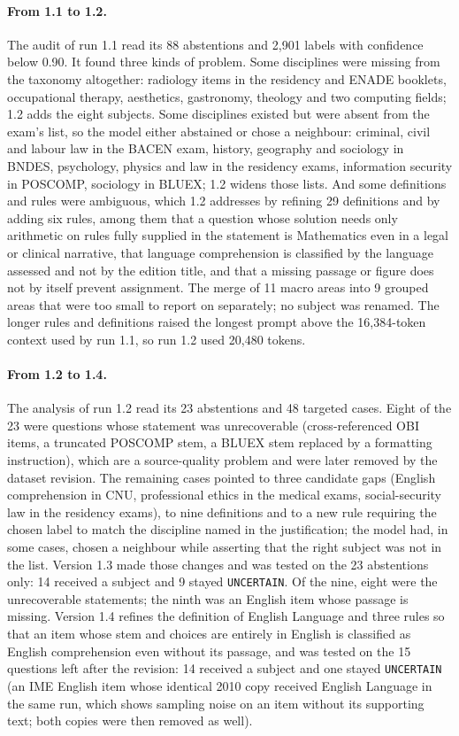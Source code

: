 \paragraph{From 1.1 to 1.2.} The audit of run 1.1 read its 88 abstentions
and 2,901 labels with confidence below 0.90. It found three kinds of problem.
Some disciplines were missing from the taxonomy altogether: radiology items in
the residency and ENADE booklets, occupational therapy, aesthetics,
gastronomy, theology and two computing fields; 1.2 adds the eight subjects.
Some disciplines existed but were absent from the exam's list, so the model
either abstained or chose a neighbour: criminal, civil and labour law in the
BACEN exam, history, geography and sociology in BNDES, psychology, physics and
law in the residency exams, information security in POSCOMP, sociology in
BLUEX; 1.2 widens those lists. And some definitions and rules were
ambiguous, which 1.2 addresses by refining 29 definitions and by adding six
rules, among them that a question whose solution needs only arithmetic on
rules fully supplied in the statement is Mathematics even in a legal or
clinical narrative, that language comprehension is classified by the language
assessed and not by the edition title, and that a missing passage or figure
does not by itself prevent assignment. The merge of 11 macro areas into 9
grouped areas that were too small to report on separately; no subject was
renamed. The longer rules and definitions raised the longest prompt above the
16,384-token context used by run 1.1, so run 1.2 used 20,480 tokens.

\paragraph{From 1.2 to 1.4.} The analysis of run 1.2 read its 23
abstentions and 48 targeted cases. Eight of the 23 were questions whose
statement was unrecoverable (cross-referenced OBI items, a truncated POSCOMP
stem, a BLUEX stem replaced by a formatting instruction), which are a
source-quality problem and were later removed by the dataset revision. The
remaining cases pointed to three candidate gaps (English comprehension in
CNU, professional ethics in the medical exams, social-security law in the
residency exams), to nine definitions and to a new rule requiring the chosen
label to match the discipline named in the justification; the model had, in
some cases, chosen a neighbour while asserting that the right subject was not
in the list. Version 1.3 made those changes and was tested on the 23
abstentions only: 14 received a subject and 9 stayed \texttt{UNCERTAIN}. Of
the nine, eight were the unrecoverable statements; the ninth was an English
item whose passage is missing. Version 1.4 refines the definition of English
Language and three rules so that an item whose stem and choices are entirely
in English is classified as English comprehension even without its passage,
and was tested on the 15 questions left after the revision: 14 received a
subject and one stayed \texttt{UNCERTAIN} (an IME English item whose
identical 2010 copy received English Language in the same run, which shows
sampling noise on an item without its supporting text; both copies were then
removed as well).

